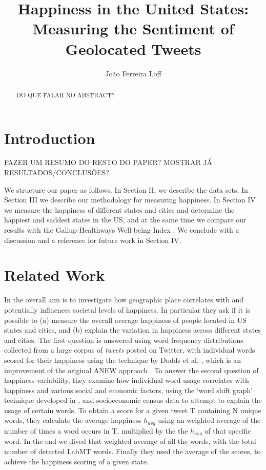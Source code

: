 \documentclass{llncs}
\begin{document}
\title{Happiness in the United States: Measuring the Sentiment of Geolocated Tweets}

\author{João Ferreira Loff \newline {}}

\maketitle

\begin{abstract}
DO QUE FALAR NO ABSTRACT?
\end{abstract}


\section{Introduction}

FAZER UM RESUMO DO RESTO DO PAPER? MOSTRAR JÁ RESULTADOS/CONCLUSÕES?

We structure our paper as follows. In Section II, we describe the data sets. In Section III we describe our methodology for measuring happiness. In Section IV we measure the happiness of different states and cities and determine the happiest and saddest states in the US, and at the same time we compare our results with the Gallup-Healthways Well-being Index \cite{GallupHealthway2013}. We conclude with a discussion and a reference for future work in Section IV.

\section{Related Work}

In \cite{Mitchell2013,Dodds2011,Frank2013} the overall aim is to investigate how geographic place correlates with and potentially influences societal levels of happiness. In particular they ask if it is possible to (a) measure the overall average happiness of people located in US states and cities, and (b) explain the variation in happiness across different states and cities.
The first question is answered using word frequency distributions collected from a large corpus of \emph{tweets} posted on Twitter, with individual words scored for their happiness using the technique by Dodds et al. \cite{Dodds2009}, which is an improvement of the original ANEW approach \cite{Bradley1999}. To answer the second question of happiness variability, they examine how individual word usage correlates with happiness and various social and economic factors, using the ‘word shift graph' technique developed in \cite{Dodds2011,Dodds2009}, and socioeconomic census data to attempt to explain the usage of certain words.
To obtain a score for a given tweet T containing N unique words, they calculate the average happiness $h_{avg}$ using an weighted average of the number of times a word occurs in T, multiplied by the the $h_{avg}$ of that specific word. In the end we dived that weighted average of all the words, with the total number of detected LabMT words. Finally they used the average of the scores, to achieve the happiness scoring of a given state.
\end{document}
